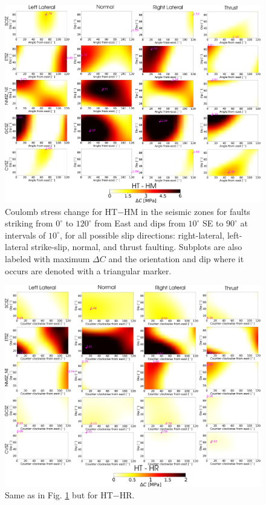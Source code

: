 \documentclass[draft,linenumbers]{agujournal2018}
\begin{document}
\begin{figure}[ht]
    \centering
    \includegraphics[width=\linewidth]{figures/ht_hm_summ.png}
    \caption{Coulomb stress change for HT$-$HM in the seismic zones for faults striking from $0^\circ$ to $120^\circ$ from East and dips from $10^\circ$ SE to $90^\circ$ at intervals of $10^\circ$, for all possible slip directions: right-lateral, left-lateral strike-slip, normal, and thrust faulting. Subplots are also labeled with maximum $\Delta C$ and the orientation and dip where it occurs are denoted with a triangular marker.}
    \label{cs_ht_hm}
\end{figure}
%
\begin{figure}[ht]
    \centering
    \includegraphics[width=\linewidth]{figures/ht_hr_summ.png}
    \caption{Same as in Fig. \ref{cs_ht_hm} but for HT$-$HR.}
    \label{cs_ht_hr}
\end{figure}
\end{document}
